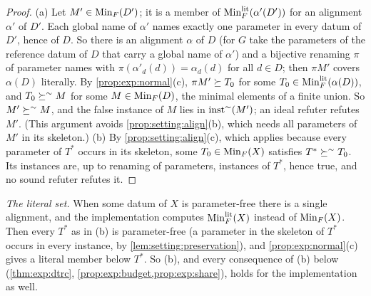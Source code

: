 \begin{proof}
(a) Let $M'\in\mathrm{Min}_F(D')$; it is a member of $\mathrm{Min}^{\mathrm{lit}}_F(\alpha'(D'))$ for an alignment $\alpha'$ of $D'$. Each global name of $\alpha'$ names exactly one parameter in every datum of $D'$, hence of $D$. So there is an alignment $\alpha$ of $D$ (for $G$ take the parameters of the reference datum of $D$ that carry a global name of $\alpha'$) and a bijective renaming $\pi$ of parameter names with $\pi(\alpha'_d(d))=\alpha_d(d)$ for all $d\in D$; then $\pi M'$ covers $\alpha(D)$ literally. By \cref{prop:exp:normal}(c), $\pi M'\succeq T_0$ for some $T_0\in\mathrm{Min}^{\mathrm{lit}}_F(\alpha(D))$, and $T_0\succeq^{\sim}M$ for some $M\in\mathrm{Min}_F(D)$, the minimal elements of a finite union. So $M'\succeq^{\sim}M$, and the false instance of $M$ lies in $\mathrm{inst}^{\sim}(M')$; an ideal refuter refutes $M'$. (This argument avoids \cref{prop:setting:align}(b), which needs all parameters of $M'$ in its skeleton.)
(b) By \cref{prop:setting:align}(c), which applies because every parameter of $T^*$ occurs in its skeleton, some $T_0\in\mathrm{Min}_F(X)$ satisfies $T^*\succeq^{\sim}T_0$. Its instances are, up to renaming of parameters, instances of $T^*$, hence true, and no sound refuter refutes it.
\end{proof}

\emph{The literal set.} When some datum of $X$ is parameter-free there is a single alignment, and the implementation computes $\mathrm{Min}^{\mathrm{lit}}_F(X)$ instead of $\mathrm{Min}_F(X)$. Then every $T^*$ as in (b) is parameter-free (a parameter in the skeleton of $T^*$ occurs in every instance, by \cref{lem:setting:preservation}), and \cref{prop:exp:normal}(c) gives a literal member below $T^*$. So (b), and every consequence of (b) below (\cref{thm:exp:dtrc}, \cref{prop:exp:budget,prop:exp:share}), holds for the implementation as well.

